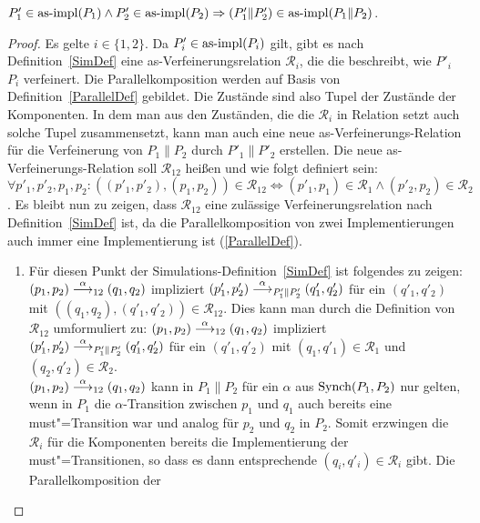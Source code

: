 \begin{Lem}
  \label{impParallelLem}
  $P'_1\in\mathrm{as}\text{-}\mathrm{impl} (P_1) \land P'_2 \in\mathrm{as}\text{-}\mathrm{impl} (P_2) \Rightarrow (P'_1\|P'_2)
  \in\mathrm{as}\text{-}\mathrm{impl} (P_1\|P_2)$.
\end{Lem}

\begin{proof}
  Es gelte $i\in\{1,2\}$. Da $P'_i\in\mathrm{as}\text{-}\mathrm{impl} (P_i)$ gilt, gibt es nach
  Definition~\ref{SimDef} eine as-Verfeinerungsrelation $\mathcal{R}_i$, die
  die beschreibt, wie $P'_i$ $P_i$ verfeinert. Die Parallelkomposition werden
  auf Basis von Definition~\ref{ParallelDef} gebildet. Die Zustände sind also
  Tupel der Zustände der Komponenten. In dem man aus den Zuständen, die die
  $\mathcal{R}_i$ in Relation setzt auch solche Tupel zusammensetzt, kann man
  auch eine neue as-Verfeinerungs-Relation für die Verfeinerung von $P_1\|P_2$
  durch $P'_1\|P'_2$ erstellen. Die neue as-Verfeinerungs-Relation soll
  $\mathcal{R}_{12}$ heißen und wie folgt definiert sein:
  $\forall p'_1,p'_2,p_1,p_2: ((p'_1,p'_2),(p_1,p_2))\in\mathcal{R}_{12}
  \Leftrightarrow (p'_1,p_1)\in\mathcal{R}_1 \land (p'_2,p_2)\in\mathcal{R}_2$.
  Es bleibt nun zu zeigen, dass $\mathcal{R}_{12}$ eine zulässige
  Verfeinerungsrelation nach Definition~\ref{SimDef} ist, da die
  Parallelkomposition von zwei Implementierungen auch immer eine
  Implementierung ist (\ref{ParallelDef}).
  \begin{enumerate}
    \item Für diesen Punkt der Simulations-Definition~\ref{SimDef} ist
      folgendes zu zeigen: $(p_1,p_2)\must[\alpha]_{12}(q_1,q_2)$ impliziert
      $(p'_1,p'_2)\must[\alpha]_{P'_1\|P'_2}(q'_1,q'_2)$ für ein $(q'_1,q'_2)$
      mit $((q_1,q_2),(q'_1,q'_2))\in\mathcal{R}_{12}$. Dies kann man durch die
      Definition von $\mathcal{R}_{12}$ umformuliert
      zu: $(p_1,p_2)\must[\alpha]_{12}(q_1,q_2)$ impliziert
      $(p'_1,p'_2)\must[\alpha]_{P'_1\|P'_2}(q'_1,q'_2)$ für ein $(q'_1,q'_2)$
      mit $(q_1,q'_1)\in\mathcal{R}_1$ und $(q_2,q'_2)\in\mathcal{R}_2$.\\
      $(p_1,p_2)\must[\alpha]_{12}(q_1,q_2)$ kann in $P_1\|P_2$ für ein
      $\alpha$ aus $\mathrm{Synch} (P_1,P_2)$ nur gelten, wenn in $P_1$ die
      $\alpha$-Transition zwischen $p_1$ und $q_1$ auch bereits eine
      must"=Transition war und analog für $p_2$ und $q_2$ in $P_2$. Somit
      erzwingen die $\mathcal{R}_i$ für die Komponenten bereits die
      Implementierung der must"=Transitionen, so dass es dann entsprechende
      $(q_i,q'_i)\in\mathcal{R}_i$ gibt. Die Parallelkomposition der

\end{enumerate}
\end{proof}
